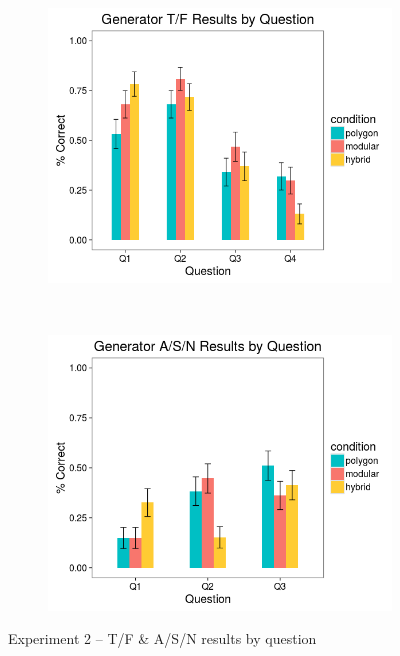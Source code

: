 \documentclass[man,10pt]{apa6}
\begin{document}
\begin{figure}[H]
\centering
\begin{subfigure}[c]{0.45\textwidth}
\centering
\includegraphics[width=\textwidth]{figures/2/gen_TF_by_Q.png}
\end{subfigure}
~
\begin{subfigure}[c]{0.45\textwidth}
\centering
\includegraphics[width=\textwidth]{figures/2/gen_ASN_by_Q.png}
\end{subfigure}
\caption{Experiment 2 -- T/F \& A/S/N results by question}
\end{figure}\noindent 
\end{document}
